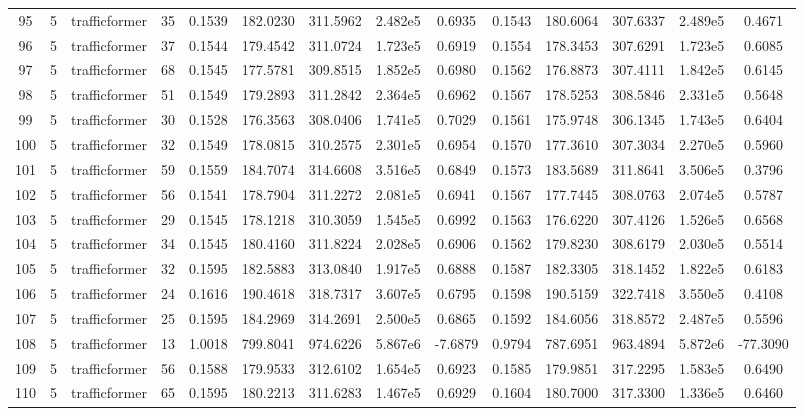 \begin{landscape}
\begin{longtable}{c | c | c | c | c | c | c | c | c | c | c | c | c | c}
	95 & 5 & trafficformer & 35 & 0.1539 & 182.0230 & 311.5962 & 2.482e5 & 0.6935 & 0.1543 & 180.6064 & 307.6337 & 2.489e5 & 0.4671 \\
	96 & 5 & trafficformer & 37 & 0.1544 & 179.4542 & 311.0724 & 1.723e5 & 0.6919 & 0.1554 & 178.3453 & 307.6291 & 1.723e5 & 0.6085 \\
	97 & 5 & trafficformer & 68 & 0.1545 & 177.5781 & 309.8515 & 1.852e5 & 0.6980 & 0.1562 & 176.8873 & 307.4111 & 1.842e5 & 0.6145 \\
	98 & 5 & trafficformer & 51 & 0.1549 & 179.2893 & 311.2842 & 2.364e5 & 0.6962 & 0.1567 & 178.5253 & 308.5846 & 2.331e5 & 0.5648 \\
	99 & 5 & trafficformer & 30 & 0.1528 & 176.3563 & 308.0406 & 1.741e5 & 0.7029 & 0.1561 & 175.9748 & 306.1345 & 1.743e5 & 0.6404 \\
	100 & 5 & trafficformer & 32 & 0.1549 & 178.0815 & 310.2575 & 2.301e5 & 0.6954 & 0.1570 & 177.3610 & 307.3034 & 2.270e5 & 0.5960 \\
	101 & 5 & trafficformer & 59 & 0.1559 & 184.7074 & 314.6608 & 3.516e5 & 0.6849 & 0.1573 & 183.5689 & 311.8641 & 3.506e5 & 0.3796 \\
	102 & 5 & trafficformer & 56 & 0.1541 & 178.7904 & 311.2272 & 2.081e5 & 0.6941 & 0.1567 & 177.7445 & 308.0763 & 2.074e5 & 0.5787 \\
	103 & 5 & trafficformer & 29 & 0.1545 & 178.1218 & 310.3059 & 1.545e5 & 0.6992 & 0.1563 & 176.6220 & 307.4126 & 1.526e5 & 0.6568 \\
	104 & 5 & trafficformer & 34 & 0.1545 & 180.4160 & 311.8224 & 2.028e5 & 0.6906 & 0.1562 & 179.8230 & 308.6179 & 2.030e5 & 0.5514 \\
	105 & 5 & trafficformer & 32 & 0.1595 & 182.5883 & 313.0840 & 1.917e5 & 0.6888 & 0.1587 & 182.3305 & 318.1452 & 1.822e5 & 0.6183 \\
	106 & 5 & trafficformer & 24 & 0.1616 & 190.4618 & 318.7317 & 3.607e5 & 0.6795 & 0.1598 & 190.5159 & 322.7418 & 3.550e5 & 0.4108 \\
	107 & 5 & trafficformer & 25 & 0.1595 & 184.2969 & 314.2691 & 2.500e5 & 0.6865 & 0.1592 & 184.6056 & 318.8572 & 2.487e5 & 0.5596 \\
	108 & 5 & trafficformer & 13 & 1.0018 & 799.8041 & 974.6226 & 5.867e6 & -7.6879 & 0.9794 & 787.6951 & 963.4894 & 5.872e6 & -77.3090 \\
	109 & 5 & trafficformer & 56 & 0.1588 & 179.9533 & 312.6102 & 1.654e5 & 0.6923 & 0.1585 & 179.9851 & 317.2295 & 1.583e5 & 0.6490 \\
	110 & 5 & trafficformer & 65 & 0.1595 & 180.2213 & 311.6283 & 1.467e5 & 0.6929 & 0.1604 & 180.7000 & 317.3300 & 1.336e5 & 0.6460 \\

\end{longtable}
\end{landscape}
